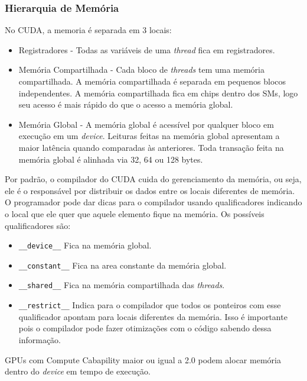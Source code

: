 \subsubsection{Hierarquia de Memória}
No CUDA, a memoria é separada em 3 locais:

\begin{itemize}
  \item Registradores - Todas as variáveis de uma \textit{thread} fica em registradores.
  \item Memória Compartilhada - Cada bloco de \textit{threads} tem uma memória compartilhada. A memória compartilhada é separada em
          pequenos blocos independentes. A memória compartilhada fica em chips dentro dos SMs, logo seu acesso é mais rápido do que o acesso a
          memória global.
  \item Memória Global - A memória global é acessível por qualquer bloco em execução em um \textit{device}.
        Leituras feitas na memória global apresentam a maior latência quando comparadas às anteriores.
        Toda transação feita na memória global é alinhada via 32, 64 ou 128 bytes.

\end{itemize}

Por padrão, o compilador do CUDA cuida do gerenciamento da memória, ou seja, ele é o responsável por distribuir os dados
entre os locais diferentes de memória. O programador pode dar dicas para o compilador usando qualificadores indicando o local
que ele quer que aquele elemento fique na memória. Os possíveis qualificadores são:
\begin{itemize}
  \item \verb#__device__# Fica na memória global.
  \item \verb#__constant__# Fica na area constante da memória global.
  \item \verb#__shared__# Fica na memória compartilhada das \textit{threads}.
  \item \verb#__restrict__# Indica para o compilador que todos os ponteiros com esse qualificador apontam para locais diferentes
                            da memória. Isso é importante pois o compilador pode fazer otimizações com o código sabendo dessa informação.
\end{itemize}

GPUs com Compute Cabapility maior ou igual a 2.0 podem alocar memória dentro do \textit{device} em tempo de execução.
